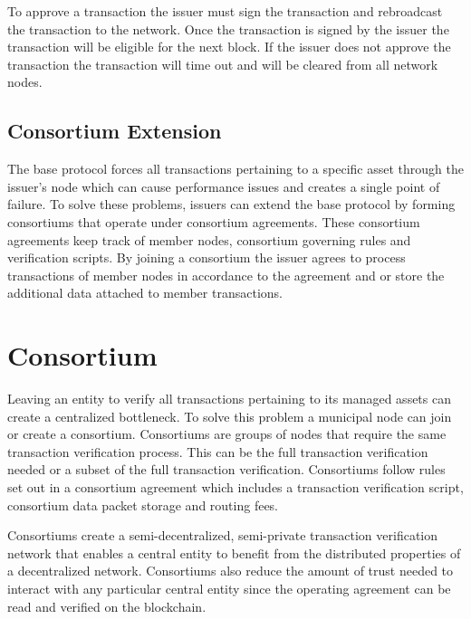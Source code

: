 \documentclass[12pt]{article}
\begin{document}
To approve a transaction the issuer must sign the transaction and rebroadcast 
the transaction to the network. Once the transaction is signed by the issuer
the transaction will be eligible for the next block.  
If the issuer does not approve the transaction the transaction will
time out and will be cleared from all network nodes.

\subsection{Consortium Extension}

The base protocol forces all transactions pertaining to a specific asset through 
the issuer's node which can cause performance issues and creates a single point 
of failure.  To solve these problems, issuers can extend the base protocol by 
forming consortiums that operate under consortium agreements.  These consortium 
agreements keep track of member nodes, consortium governing rules and 
verification scripts.  By joining a consortium the issuer agrees to process 
transactions of member nodes in accordance to the agreement and or store 
the additional data attached to member transactions.

\section{Consortium}

Leaving an entity to verify all transactions pertaining to its managed assets can create 
a centralized bottleneck.  To solve this problem a municipal node can join or create a consortium.  
Consortiums are groups of nodes that require the same transaction verification process.  
This can be the full transaction verification needed or a subset of the full transaction verification. 
Consortiums follow rules set out in a consortium agreement which includes a transaction 
verification script, consortium data packet storage and routing fees.

Consortiums create a semi-decentralized, semi-private transaction verification network that 
enables a central entity to benefit from the distributed properties of a decentralized network.  
Consortiums also reduce the amount of trust needed to interact with any particular central 
entity since the operating agreement can be read and verified on the blockchain.
\end{document}
